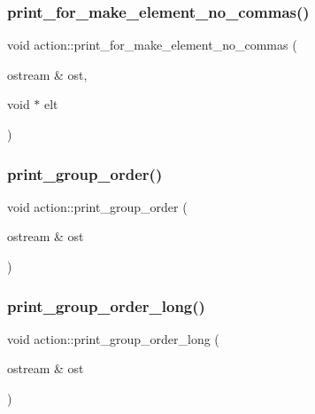 \subsubsection{\texorpdfstring{print\+\_\+for\+\_\+make\+\_\+element\+\_\+no\+\_\+commas()}{print\_for\_make\_element\_no\_commas()}}
{\footnotesize\ttfamily void action\+::print\+\_\+for\+\_\+make\+\_\+element\+\_\+no\+\_\+commas (\begin{DoxyParamCaption}\item[{ostream \&}]{ost,  }\item[{void $\ast$}]{elt }\end{DoxyParamCaption})}

\mbox{\label{classaction_aaf5533b61c20a11f8c0efcf7ff718d7d}} 
\subsubsection{\texorpdfstring{print\+\_\+group\+\_\+order()}{print\_group\_order()}}
{\footnotesize\ttfamily void action\+::print\+\_\+group\+\_\+order (\begin{DoxyParamCaption}\item[{ostream \&}]{ost }\end{DoxyParamCaption})}

\mbox{\label{classaction_a75c89bc9786a75b63d42429f03160230}} 
\subsubsection{\texorpdfstring{print\+\_\+group\+\_\+order\+\_\+long()}{print\_group\_order\_long()}}
{\footnotesize\ttfamily void action\+::print\+\_\+group\+\_\+order\+\_\+long (\begin{DoxyParamCaption}\item[{ostream \&}]{ost }\end{DoxyParamCaption})}

\mbox{\label{classaction_a6f89e493e5c5a32e5c3b8963d438ce86}} 
